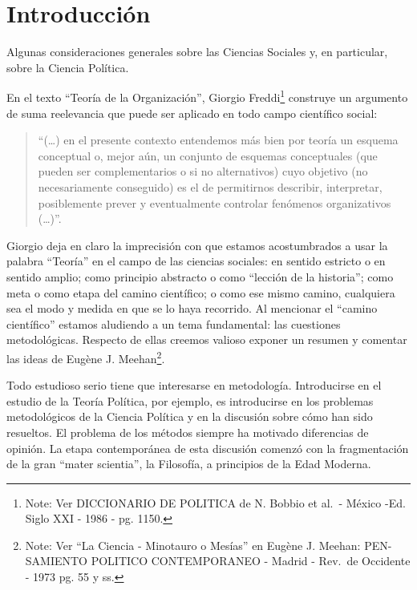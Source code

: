 \documentclass[
]{book}
\begin{document}
\hypertarget{Introducciuxf3n}{%
\chapter{Introducción}\label{Introducciuxf3n}}

Algunas consideraciones generales sobre las Ciencias Sociales y, en particular, sobre la Ciencia Política.

En el texto ``Teoría de la Organización'', Giorgio Freddi\footnote{Note: Ver DICCIONARIO DE POLITICA de N. Bobbio et al.~- México -Ed. Siglo XXI - 1986 - pg. 1150.} construye un argumento de suma reelevancia que puede ser aplicado en todo campo científico social:

\begin{quote}
``(\ldots) en el presente contexto entendemos más bien por teoría un esquema conceptual o, mejor aún, un conjunto de esquemas conceptuales (que pueden ser complementarios o si no alternativos) cuyo objetivo (no necesariamente conseguido) es el de permitirnos describir, interpretar, posiblemente prever y eventualmente controlar fenómenos organizativos (\ldots)''.
\end{quote}

Giorgio deja en claro la imprecisión con que estamos acostumbrados a usar la palabra ``Teoría'' en el campo de las ciencias sociales: en sentido estricto o en sentido amplio; como principio abstracto o como ``lección de la historia''; como meta o como etapa del camino científico; o como ese mismo camino, cualquiera sea el modo y medida en que se lo haya recorrido. Al mencionar el ``camino científico'' estamos aludiendo a un tema fundamental: las cuestiones metodológicas. Respecto de ellas creemos valioso exponer un resumen y comentar las ideas de Eugène J. Meehan\footnote{Note: Ver ``La Ciencia - Minotauro o Mesías'' en Eugène J. Meehan: PEN- SAMIENTO POLITICO CONTEMPORANEO - Madrid - Rev.~de Occidente - 1973 pg. 55 y ss.}.

Todo estudioso serio tiene que interesarse en metodología. Introducirse en el estudio de la Teoría Política, por ejemplo, es introducirse en los problemas metodológicos de la Ciencia Política y en la discusión sobre cómo han sido resueltos. El problema de los métodos siempre ha motivado diferencias de opinión. La etapa contemporánea de esta discusión comenzó con la fragmentación de la gran ``mater scientia'', la Filosofía, a principios de la Edad Moderna.
\end{document}
